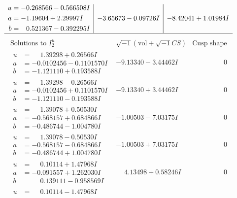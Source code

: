 \documentclass[1p]{elsarticle_modified}
\theoremstyle{definition}
\newcommand{\I}{\sqrt{-1}}
\begin{document}
$$\begin{array}{c|c|c}
\begin{aligned}
u &= -0.268566 - 0.566508 I \\
a &= -1.19604 + 2.29997 I \\
b &= \phantom{-}0.521367 - 0.392295 I\end{aligned}
 & -3.65673 - 0.09726 I & -8.42041 + 1.01984 I\\
 \hline 
 \end{array}$$\newpage$$\begin{array}{c|c|c}  
\text{Solutions to }I^u_{2}& \I (\text{vol} + \sqrt{-1}CS) & \text{Cusp shape}\\
 \hline 
\begin{aligned}
u &= \phantom{-}1.39298 + 0.26566 I \\
a &= -0.0102456 - 0.1101570 I \\
b &= -1.121110 + 0.193588 I\end{aligned}
 & -9.13340 - 3.44462 I & \phantom{-0.000000 } 0 \\ \hline\begin{aligned}
u &= \phantom{-}1.39298 - 0.26566 I \\
a &= -0.0102456 + 0.1101570 I \\
b &= -1.121110 - 0.193588 I\end{aligned}
 & -9.13340 + 3.44462 I & \phantom{-0.000000 } 0 \\ \hline\begin{aligned}
u &= \phantom{-}1.39078 + 0.50530 I \\
a &= -0.568157 + 0.684866 I \\
b &= -0.486744 - 1.004780 I\end{aligned}
 & -1.00503 - 7.03175 I & \phantom{-0.000000 } 0 \\ \hline\begin{aligned}
u &= \phantom{-}1.39078 - 0.50530 I \\
a &= -0.568157 - 0.684866 I \\
b &= -0.486744 + 1.004780 I\end{aligned}
 & -1.00503 + 7.03175 I & \phantom{-0.000000 } 0 \\ \hline\begin{aligned}
u &= \phantom{-}0.10114 + 1.47968 I \\
a &= -0.091557 + 1.262030 I \\
b &= \phantom{-}0.139111 - 0.958569 I\end{aligned}
 & \phantom{-}4.13498 + 0.58246 I & \phantom{-0.000000 } 0 \\ \hline\begin{aligned}
u &= \phantom{-}0.10114 - 1.47968 I \\

\end{aligned}
\end{array}$$
\end{document}
